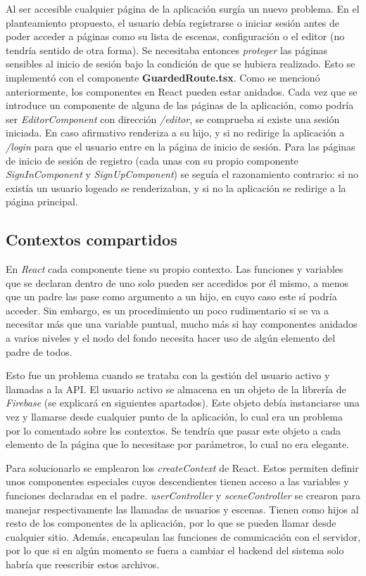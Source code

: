 Al ser accesible cualquier página de la aplicación surgía un nuevo problema. En el planteamiento propuesto, el usuario debía registrarse o iniciar sesión antes de poder acceder a páginas como su lista de escenas, configuración o el editor (no tendría sentido de otra forma). Se necesitaba entonces \textit{proteger} las páginas sensibles al inicio de sesión bajo la condición de que se hubiera realizado. Esto se implementó con el componente \textbf{GuardedRoute.tsx}. Como se mencionó anteriormente, los componentes en React pueden estar anidados. Cada vez que se introduce un componente de alguna de las páginas de la aplicación, como podría ser \textit{EditorComponent} con dirección \textit{/editor}, se comprueba si existe una sesión iniciada. En caso afirmativo renderiza a su hijo, y si no redirige la aplicación a \textit{/login} para que el usuario entre en la página de inicio de sesión. Para las páginas de inicio de sesión de registro (cada unas con su propio componente \textit{SignInComponent} y \textit{SignUpComponent}) se seguía el razonamiento contrario: si no existía un usuario logeado se renderizaban, y si no la aplicación se redirige a la página principal.

\subsection{Contextos compartidos}

En \textit{React} cada componente tiene su propio contexto. Las funciones y variables que se declaran dentro de uno solo pueden ser accedidos por él mismo, a menos que un padre las pase como argumento a un hijo, en cuyo caso este sí  podría acceder. Sin embargo, es un procedimiento un poco rudimentario si se va a necesitar más que una variable puntual, mucho más si hay componentes anidados a varios niveles y el nodo del fondo necesita hacer uso de algún elemento del padre de todos.

Esto fue un problema cuando se trataba con la gestión del usuario activo y llamadas a la API. El usuario activo se almacena en un objeto de la librería de \textit{Firebase} (se explicará en siguientes apartados). Este objeto debía instanciarse una vez y llamarse desde cualquier punto de la aplicación, lo cual era un problema por lo comentado sobre los contextos. Se tendría que pasar este objeto a cada elemento de la página que lo necesitase por parámetros, lo cual no era elegante.

Para solucionarlo se emplearon los \textit{createContext} de React. Estos permiten definir unos componentes especiales cuyos descendientes tienen acceso a las variables y funciones declaradas en el padre. \textit{userController} y \textit{sceneController} se crearon para manejar respectivamente las llamadas de usuarios y escenas. Tienen como hijos al resto de los componentes de la aplicación, por lo que se pueden llamar desde cualquier sitio. Además, encapsulan las funciones de comunicación con el servidor, por lo que si en algún momento se fuera a cambiar el backend del sistema solo habría que reescribir estos archivos.

